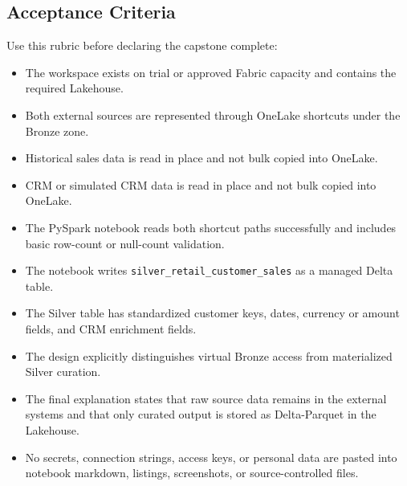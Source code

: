 \subsection*{Acceptance Criteria}
Use this rubric before declaring the capstone complete:
\begin{itemize}
    \item[\(\square\)] The workspace exists on trial or approved Fabric capacity and contains the required Lakehouse.
    \item[\(\square\)] Both external sources are represented through OneLake shortcuts under the Bronze zone.
    \item[\(\square\)] Historical sales data is read in place and not bulk copied into OneLake.
    \item[\(\square\)] CRM or simulated CRM data is read in place and not bulk copied into OneLake.
    \item[\(\square\)] The PySpark notebook reads both shortcut paths successfully and includes basic row-count or null-count validation.
    \item[\(\square\)] The notebook writes \texttt{silver\_retail\_customer\_sales} as a managed Delta table.
    \item[\(\square\)] The Silver table has standardized customer keys, dates, currency or amount fields, and CRM enrichment fields.
    \item[\(\square\)] The design explicitly distinguishes virtual Bronze access from materialized Silver curation.
    \item[\(\square\)] The final explanation states that raw source data remains in the external systems and that only curated output is stored as Delta-Parquet in the Lakehouse.
    \item[\(\square\)] No secrets, connection strings, access keys, or personal data are pasted into notebook markdown, listings, screenshots, or source-controlled files.
\end{itemize}

